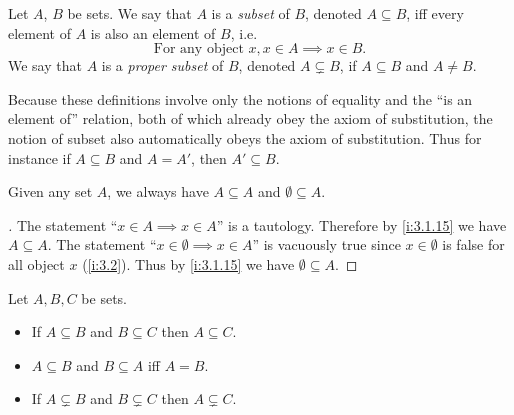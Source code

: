 \begin{defn}[Subsets]\label{i:3.1.15}
  Let \(A\), \(B\) be sets.
  We say that \(A\) is a \emph{subset} of \(B\), denoted \(A \subseteq B\), iff every element of \(A\) is also an element of \(B\), i.e.
  \[
    \text{For any object } x, x \in A \implies x \in B.
  \]
  We say that \(A\) is a \emph{proper subset} of \(B\), denoted \(A \subsetneq B\), if \(A \subseteq B\) and \(A \neq B\).
\end{defn}

\begin{rmk}\label{i:3.1.16}
  Because these definitions involve only the notions of equality and the ``is an element of'' relation, both of which already obey the axiom of substitution, the notion of subset also automatically obeys the axiom of substitution.
  Thus for instance if \(A \subseteq B\) and \(A = A'\), then \(A' \subseteq B\).
\end{rmk}

\begin{eg}\label{i:3.1.17}
  Given any set \(A\), we always have \(A \subseteq A\) and \(\emptyset \subseteq A\).
\end{eg}

\begin{proof}[]
  The statement ``\(x \in A \implies x \in A\)'' is a tautology.
  Therefore by \cref{i:3.1.15} we have \(A \subseteq A\).
  The statement ``\(x \in \emptyset \implies x \in A\)'' is vacuously true since \(x \in \emptyset\) is false for all object \(x\) (\cref{i:3.2}).
  Thus by \cref{i:3.1.15} we have \(\emptyset \subseteq A\).
\end{proof}

\begin{prop}\label{i:3.1.18}
  Let \(A, B, C\) be sets.
  \begin{itemize}
    \item If \(A \subseteq B\) and \(B \subseteq C\) then \(A \subseteq C\).
    \item \(A \subseteq B\) and \(B \subseteq A\) iff \(A = B\).
    \item If \(A \subsetneq B\) and \(B \subsetneq C\) then \(A \subsetneq C\).
  \end{itemize}
\end{prop}

